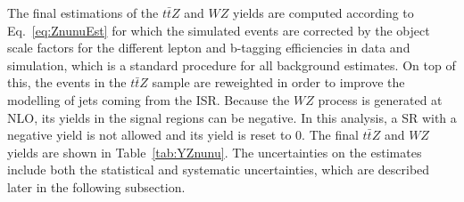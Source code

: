 The final estimations of the $t\bar{t}Z$ and $WZ$ yields are computed according to Eq.~\ref{eq:ZnunuEst} for which the simulated events are corrected by the object scale factors for the different lepton and b-tagging efficiencies in data and simulation, which is a standard procedure for all background estimates. On top of this, the events in the $t\bar{t}Z$ sample are reweighted in order to improve the modelling of jets coming from the ISR.   Because the $WZ$ process is generated at NLO, its yields in the signal regions can be negative. In this analysis, a SR with a negative yield is not allowed and its yield is reset to 0. The final $t\bar{t}Z$ and $WZ$ yields are shown in Table~\ref{tab:YZnunu}.  The uncertainties on the estimates include both the statistical and systematic uncertainties, which are described later in the following subsection.


